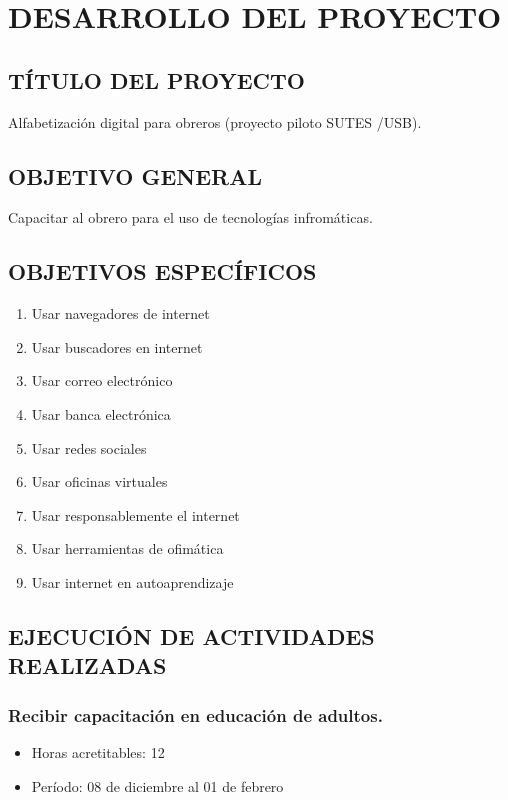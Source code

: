 	\chapter{DESARROLLO DEL PROYECTO}

        \section{TÍTULO DEL PROYECTO}
            Alfabetización digital para obreros (proyecto piloto SUTES /USB).
            
        \section{OBJETIVO GENERAL}
            Capacitar al obrero para el uso de tecnologías infromáticas.
            
        \section{OBJETIVOS ESPECÍFICOS}
            \begin{enumerate}
                \item Usar navegadores de internet
                \item Usar buscadores en internet
                \item Usar correo electrónico
                \item Usar banca electrónica
                \item Usar redes sociales
                \item Usar oficinas virtuales
                \item Usar responsablemente el internet
                \item Usar herramientas de ofimática
                \item Usar internet en autoaprendizaje
            \end{enumerate}
            
        \section{EJECUCIÓN DE ACTIVIDADES REALIZADAS}

             \subsection {Recibir capacitación en educación de adultos.}
             \begin{itemize}
                 \item Horas acretitables: 12
                 \item Período: 08 de diciembre al 01 de febrero
                \end{itemize}
             
